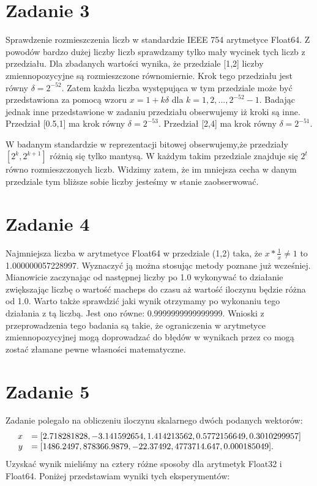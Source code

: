\documentclass{article}
\begin{document}
\section*{Zadanie 3}
Sprawdzenie rozmieszczenia liczb w standardzie IEEE 754 arytmetyce Float64. Z powodów bardzo dużej liczby liczb sprawdzamy tylko mały wycinek tych liczb z przedziału. Dla zbadanych wartości wynika, że przedziale [1,2] liczby zmiennopozycyjne są rozmieszczone równomiernie. Krok tego przedziału jest równy $\delta = 2^{-52}$. Zatem każda liczba występująca w tym przedziale może być przedstawiona za pomocą wzoru $x=1+k\delta$ dla $k=1,2,...,2^{-52}-1$. Badając jednak inne przedstawione w zadaniu przedziału obserwujemy iż kroki są inne. Przedział [0.5,1] ma krok równy $\delta = 2^{-53}$. Przedział [2,4] ma krok równy $\delta = 2^{-51}$. 

W badanym standardzie w reprezentacji bitowej obserwujemy,że przedziały $[2^k, 2^{k+1}]$  różnią się tylko mantysą. W każdym takim przedziale znajduje się $2^t$ równo rozmieszczonych liczb. Widzimy zatem, że im mniejsza cecha w danym przedziale tym bliższe sobie liczby jesteśmy w stanie zaobserwować.
\section*{Zadanie 4}
Najmniejsza liczba w arytmetyce Float64 w przedziale (1,2) taka, że $x*\frac{1}{x}\neq1$ to 1.000000057228997. Wyznaczyć ją można stosując metody poznane już wcześniej. Mianowicie zaczynając od następnej liczby po 1.0 wykonywać to działanie zwiększając liczbę o wartość macheps do czasu aż wartość iloczynu będzie różna od 1.0. Warto także sprawdzić jaki wynik otrzymamy po wykonaniu tego działania z tą liczbą. Jest ono równe: 0.9999999999999999. Wnioski z przeprowadzenia tego badania są takie, że ograniczenia w arytmetyce zmiennopozycyjnej mogą doprowadzać do błędów w wynikach przez co mogą zostać złamane pewne własności matematyczne.
\section*{Zadanie 5}
Zadanie polegało na obliczeniu iloczynu skalarnego dwóch podanych wektorów: 
\[
\begin{array}{r l}
x &= [2.718281828, -3.141592654, 1.414213562, 0.5772156649, 0.3010299957] \\
y &= [1486.2497, 878366.9879, -22.37492, 4773714.647, 0.000185049].
\end{array}
\]
Uzyskać wynik mieliśmy na cztery różne sposoby dla arytmetyk Float32 i Float64. Poniżej przedstawiam wyniki tych eksperymentów:
\end{document}
